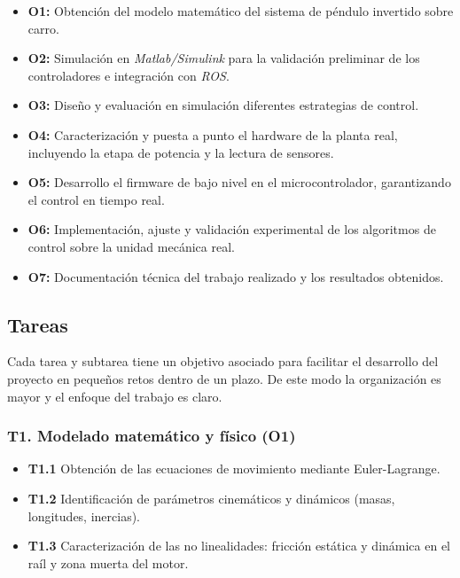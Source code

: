 \documentclass[11pt,fleqn]{book} %
\begin{document}
\begin{itemize}
	\item \textbf{O1:} Obtención del modelo matemático del sistema de péndulo invertido sobre carro.
	
	\item \textbf{O2:} Simulación en \textit{Matlab/Simulink} para la validación preliminar de los controladores e integración con \textit{ROS}.
	
	\item \textbf{O3:} Diseño y evaluación en simulación diferentes estrategias de control.
	
	\item \textbf{O4:} Caracterización y puesta a punto el hardware de la planta real, incluyendo la etapa de potencia y la lectura de sensores.
	
	\item \textbf{O5:} Desarrollo el firmware de bajo nivel en el microcontrolador, garantizando el control en tiempo real.
	
	\item \textbf{O6:} Implementación, ajuste y validación experimental de los algoritmos de control sobre la unidad mecánica real. 
	
	\item \textbf{O7:} Documentación técnica del trabajo realizado y los resultados obtenidos. 
	 
\end{itemize}

\newpage

\subsection{Tareas}

Cada tarea y subtarea tiene un objetivo asociado para facilitar el desarrollo del proyecto en pequeños retos dentro de un plazo. De este modo la organización es mayor y el enfoque del trabajo es claro.  

\subsubsection{T1. Modelado matemático y físico (O1)}
\begin{itemize}
	\item \textbf{T1.1} Obtención de las ecuaciones de movimiento mediante Euler-Lagrange.
	\item \textbf{T1.2} Identificación de parámetros cinemáticos y dinámicos (masas, longitudes, inercias).
	\item \textbf{T1.3} Caracterización de las no linealidades: fricción estática y dinámica en el raíl y zona muerta del motor.
\end{itemize}
\end{document}
